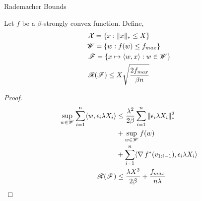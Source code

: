 \begin{frame}{Rademacher Bounds}
  \begin{theorem}
    Let $f$ be a $\beta$-strongly convex function. Define,
  \begin{align*}
    & \operatorname{\mathcal{X}} = \{ x : \|x\|_{*} \le X \} \\
    & \mathscr{W} = \{w : f(w) \le f_{max}\} \\
    & \operatorname{\mathscr{F}} = \{ x \mapsto \langle {w} , {x} \rangle : w \in \mathscr{W} \} \\
    & \operatorname{\mathscr{R}}(\operatorname{\mathscr{F}}) \le X\sqrt{\frac{2f_{max}}{\beta n}}
  \end{align*}
  \end{theorem}
\end{frame}

\begin{frame}
  \begin{proof}
    \begin{align*}
      \sup_{w \in \mathscr{W}} \sum_{i=1}^n \langle {w} , {\epsilon_i \lambda X_i} \rangle & \le \frac{\lambda^2}{2\beta}\sum_{i=1}^n \|\epsilon_i \lambda X_i\|_{*}^2 \\
      & + \sup_{w \in \mathscr{W}} f(w) \\
      & + \sum_{i=1}^n \langle {\operatorname{\nabla}{f}^{*}(v_{1:i-1})} , {\epsilon_i \lambda X_i} \rangle \\
      \operatorname{\mathscr{R}}(\operatorname{\mathscr{F}}) & \le \frac{\lambda X^2}{2\beta} + \frac{f_{max}}{n\lambda}
    \end{align*}
  \end{proof}
\end{frame}
